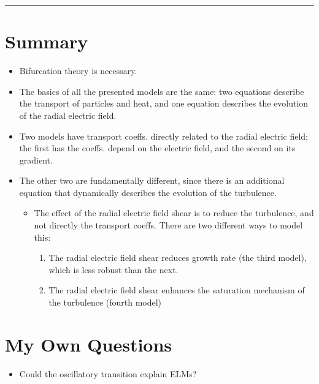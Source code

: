 \documentclass[a4paper]{article}
\begin{document}
\begin{center}\rule{3in}{0.4pt}\end{center}

\section{Summary}\label{summary}

\begin{itemize}
\item
  Bifurcation theory is necessary.
\item
  The basics of all the presented models are the same: two equations
  describe the transport of particles and heat, and one equation
  describes the evolution of the radial electric field.
\item
  Two models have transport coeffs. directly related to the radial
  electric field; the first has the coeffs. depend on the electric
  field, and the second on its gradient.
\item
  The other two are fundamentally different, since there is an
  additional equation that dynamically describes the evolution of the
  turbulence.

  \begin{itemize}
  \item
    The effect of the radial electric field shear is to reduce the
    turbulence, and not directly the transport coeffs. There are two
    different ways to model this:

    \begin{enumerate}
    \def\labelenumi{\arabic{enumi}.}
    \item
      The radial electric field shear reduces growth rate (the third
      model), which is less robust than the next.
    \item
      The radial electric field shear enhances the saturation mechanism
      of the turbulence (fourth model)
    \end{enumerate}
  \end{itemize}
\end{itemize}

\section{My Own Questions}\label{my-own-questions}

\begin{itemize}
\itemsep1pt\parskip0pt
\item
  Could the oscillatory transition explain ELMs?
\end{itemize}
\end{document}
